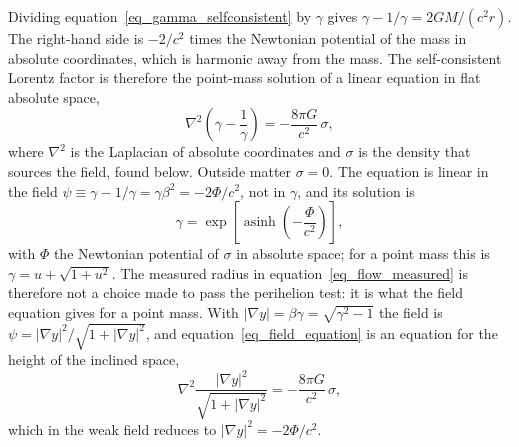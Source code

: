 \documentclass{iopjournal}
\begin{document}
Dividing equation~\eqref{eq_gamma_selfconsistent} by $\gamma$ gives $\gamma-1/\gamma=2GM/(c^2r)$. The right-hand side is $-2/c^2$ times the Newtonian potential of the mass in absolute coordinates, which is harmonic away from the mass. The self-consistent Lorentz factor is therefore the point-mass solution of a linear equation in flat absolute space,
\begin{equation}\label{eq_field_equation}
    \nabla^2\!\left(\gamma-\frac{1}{\gamma}\right)=-\frac{8\pi G}{c^2}\,\sigma ,
\end{equation}
where $\nabla^2$ is the Laplacian of absolute coordinates and $\sigma$ is the density that sources the field, found below. Outside matter $\sigma=0$. The equation is linear in the field $\psi\equiv\gamma-1/\gamma=\gamma\beta^2=-2\Phi/c^2$, not in $\gamma$, and its solution is
\begin{equation}\label{eq_gamma_asinh}
    \gamma=\exp\!\left[\operatorname{asinh}\!\left(-\frac{\Phi}{c^2}\right)\right],
\end{equation}
with $\Phi$ the Newtonian potential of $\sigma$ in absolute space; for a point mass this is $\gamma=u+\sqrt{1+u^2}$. The measured radius in equation~\eqref{eq_flow_measured} is therefore not a choice made to pass the perihelion test: it is what the field equation gives for a point mass. With $|\nabla y|=\beta\gamma=\sqrt{\gamma^2-1}$ the field is $\psi=|\nabla y|^2/\sqrt{1+|\nabla y|^2}$, and equation~\eqref{eq_field_equation} is an equation for the height of the inclined space,
\begin{equation}\label{eq_field_equation_y}
    \nabla^2\frac{|\nabla y|^2}{\sqrt{1+|\nabla y|^2}}=-\frac{8\pi G}{c^2}\,\sigma ,
\end{equation}
which in the weak field reduces to $|\nabla y|^2=-2\Phi/c^2$.
\end{document}
